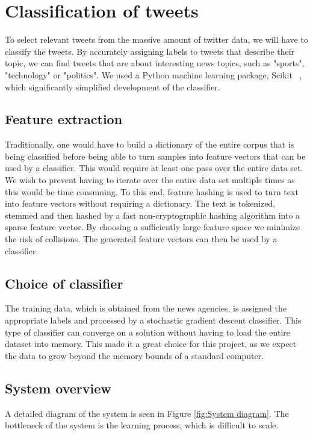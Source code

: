 \documentclass{llncs}
\begin{document}

\section{Classification of tweets}
To select relevant tweets from the massive amount of twitter data, we will have to classify the tweets. By accurately assigning labels to tweets that describe their topic, we can find tweets that are about interesting news topics, such as "sports", "technology" or "politics". We used a Python machine learning package, Scikit ~\cite{scikit-learn}, which significantly simplified development of the classifier. 

\subsection{Feature extraction}
Traditionally, one would have to build a dictionary of the entire corpus that is being classified before being able to turn samples into feature vectors that can be used by a classifier. This would require at least one pass over the entire data set. We wish to prevent having to iterate over the entire data set multiple times as this would be time consuming. To this end, feature hashing is used to turn text into feature vectors without requiring a dictionary. The text is tokenized, stemmed and then hashed by a fast non-cryptographic hashing algorithm into a sparse feature vector. By choosing a sufficiently large feature space we minimize the risk of collisions. The generated feature vectors can then be used by a classifier.

\subsection{Choice of classifier}
The training data, which is obtained from the news agencies, is assigned the appropriate labels and processed by a stochastic gradient descent classifier. This type of classifier can converge on a solution without having to load the entire dataset into memory. This made it a great choice for this project, as we expect the data to grow beyond the memory bounds of a standard computer.

\subsection{System overview}
A detailed diagram of the system is seen in Figure \ref{fig:System diagram}. The bottleneck of the system is the learning process, which is difficult to scale.
\end{document}
